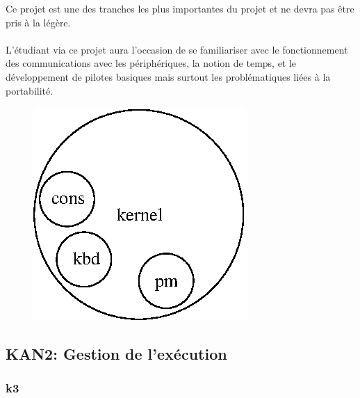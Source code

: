 \documentclass[10pt,a4wide]{article}
\begin{document}
Ce projet est une des tranches les plus importantes du projet et ne devra
pas \^etre pris \`a la l\'eg\`ere.

\paragraph{}

L'\'etudiant via ce projet aura l'occasion de se familiariser avec le
fonctionnement des communications avec les p\'eriph\'eriques, la notion de
temps, et le d\'eveloppement de pilotes basiques mais surtout les
probl\'ematiques li\'ees \`a la portabilit\'e.

\vspace{5cm}

\begin{figure}[h]
\centerline{\includegraphics{figures/k2.eps}}
\end{figure}

\newpage

\subsection{KAN2: Gestion de l'ex\'ecution}

\paragraph{}

\subsubsection{k3}

\paragraph{}
\end{document}
